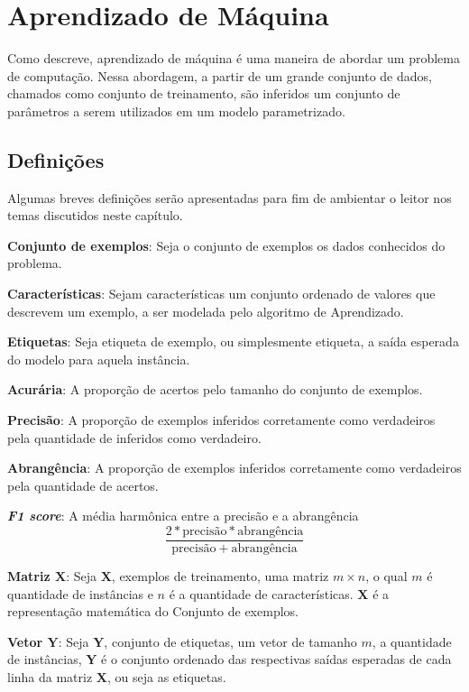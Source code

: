 \chapter{Aprendizado de Máquina}
Como \citet{bishop2006pattern} descreve, aprendizado de máquina é uma maneira de abordar um problema de computação. Nessa abordagem, a partir de um grande conjunto de dados, chamados como conjunto de treinamento, são inferidos um conjunto de parâmetros a serem utilizados em um modelo parametrizado.

\section{Definições}

Algumas breves definições serão apresentadas para fim de ambientar o leitor nos temas discutidos neste capítulo.

\begin{description}
\item \textbf{Conjunto de exemplos}: Seja o conjunto de exemplos os dados conhecidos do problema.

\item \textbf{Características}: Sejam características um conjunto ordenado de valores que descrevem um exemplo, a ser modelada pelo algoritmo de Aprendizado.

\item \textbf{Etiquetas}: Seja etiqueta de exemplo, ou simplesmente etiqueta, a saída esperada do modelo para aquela instância.

\item \textbf{Acurária}: A proporção de acertos pelo tamanho do conjunto de exemplos.

\item \textbf{Precisão}: A proporção de exemplos inferidos corretamente como verdadeiros pela quantidade de inferidos como verdadeiro.

\item \textbf{Abrangência}: A proporção de exemplos inferidos corretamente como verdadeiros pela quantidade de acertos.

\item \textbf{\textit{F1 score}}: A média harmônica entre a precisão e a abrangência
\[\frac{2 * \mathrm{precisão} * \mathrm{abrangência}}{\mathrm{precisão} + \mathrm{abrangência}}\]

\item \textbf{Matriz \(\mathbf{X}\)}: Seja \(\mathbf{X}\), exemplos de treinamento, uma matriz \(m \times n\), o qual \(m\) é quantidade de instâncias e \(n\) é a quantidade de características. \(\mathbf{X}\) é a representação matemática do Conjunto de exemplos.

\item \textbf{Vetor \(\mathbf{Y}\)}: Seja \(\mathbf{Y}\), conjunto de etiquetas, um vetor de tamanho \(m\), a quantidade de instâncias, \(\mathbf{Y}\) é o conjunto ordenado das respectivas saídas esperadas de cada linha da matriz \(\mathbf{X}\), ou seja as etiquetas.
\end{description}

